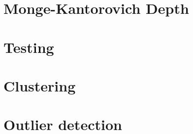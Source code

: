 

\section{Monge-Kantorovich Depth}



\section{Testing}



\section{Clustering}

\section{Outlier detection}
